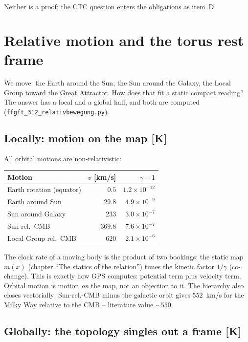 \documentclass[11pt]{report}
\begin{document}
Neither is a proof; the CTC question enters the obligations as
item~D.

\chapter{Relative motion and the torus rest frame}

We move: the Earth around the Sun, the Sun around the Galaxy, the
Local Group toward the Great Attractor. How does that fit a static
compact reading? The answer has a local and a global half, and both
are computed (\texttt{ffgft\_312\_relativbewegung.py}).

\section{Locally: motion on the map [K]}

All orbital motions are non-relativistic:

\begin{center}
\begin{tabular}{lrr}
\toprule
Motion & $v$ [km/s] & $\gamma-1$ \\
\midrule
Earth rotation (equator) & $0.5$ & $1.2\times10^{-12}$ \\
Earth around Sun & $29.8$ & $4.9\times10^{-9}$ \\
Sun around Galaxy & $233$ & $3.0\times10^{-7}$ \\
Sun rel.\ CMB & $369.8$ & $7.6\times10^{-7}$ \\
Local Group rel.\ CMB & $620$ & $2.1\times10^{-6}$ \\
\bottomrule
\end{tabular}
\end{center}

The clock rate of a moving body is the product of two bookings: the
static map $m(x)$ (chapter \enquote{The statics of the relation})
times the kinetic factor $1/\gamma$ (co-change). This is exactly how
GPS computes: potential term plus velocity term. Orbital motion is
motion \emph{on} the map, not an objection to it. The hierarchy
also closes vectorially: Sun-rel.-CMB minus the galactic orbit
gives $552$~km/s for the Milky Way relative to the CMB --
literature value $\sim550$.

\section{Globally: the topology singles out a frame [K]}
\end{document}
